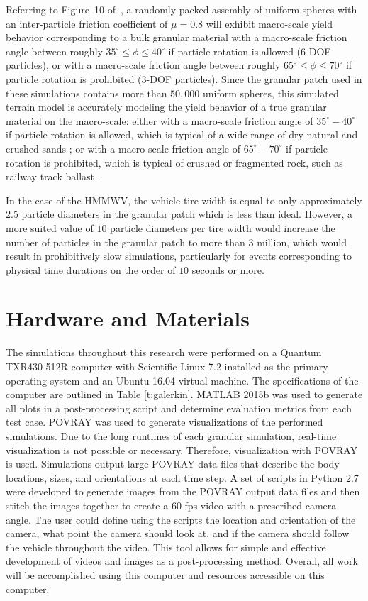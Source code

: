 \documentclass[12pt,onecolumn]{report}
\begin{document}
Referring to Figure~10 of~\cite{fleischmannetalGEGE2014}, a randomly packed assembly of uniform spheres with an inter-particle friction coefficient of $\mu = 0.8$ will exhibit macro-scale yield behavior corresponding to a bulk granular material with a macro-scale friction angle between roughly $35^\circ \leq \phi \leq 40^\circ$ if particle rotation is allowed (6-DOF particles), or with a macro-scale friction angle between roughly $65^\circ \leq \phi \leq 70^\circ$ if particle rotation is prohibited (3-DOF particles).
%
Since the granular patch used in these simulations contains more than $50,000$ uniform spheres, this simulated terrain model is accurately modeling the yield behavior of a true granular material on the macro-scale: either with a macro-scale friction angle of $35^\circ-40^\circ$ if particle rotation is allowed, which is typical of a wide range of dry natural and crushed sands \cite{Cho&Dodds&Santamarina2006}; or with a macro-scale friction angle of $65^\circ-70^\circ$ if particle rotation is prohibited, which is typical of crushed or fragmented rock, such as railway track ballast \cite{Indraratnaetal1998}.

In the case of the HMMWV, the vehicle tire width is equal to only approximately $2.5$ particle diameters in the granular patch which is less than ideal.  However, a more suited value of $10$ particle diameters per tire width would increase the number of particles in the granular patch to more than $3$ million, which would result in prohibitively slow simulations, particularly for events corresponding to physical time durations on the order of $10$ seconds or more.

\section{Hardware and Materials}\label{s:Hardware}

The simulations throughout this research were performed on a Quantum TXR430-512R computer with Scientific Linux 7.2 installed as the primary operating system and an Ubuntu 16.04 virtual machine. The specifications of the computer are outlined in Table \ref{t:galerkin}. MATLAB 2015b was used to generate all plots in a post-processing script and determine evaluation metrics from each test case. POVRAY was used to generate visualizations of the performed simulations. Due to the long runtimes of each granular simulation, real-time visualization is not possible or necessary. Therefore, visualization with POVRAY is used. Simulations output large POVRAY data files that describe the body locations, sizes, and orientations at each time step. A set of scripts in Python 2.7 were developed to generate images from the POVRAY output data files and then stitch the images together to create a 60 fps video with a prescribed camera angle. The user could define using the scripts the location and orientation of the camera, what point the camera should look at, and if the camera should follow the vehicle throughout the video. This tool allows for simple and effective development of videos and images as a post-processing method. Overall, all work will be accomplished using this computer and resources accessible on this computer.
\end{document}
